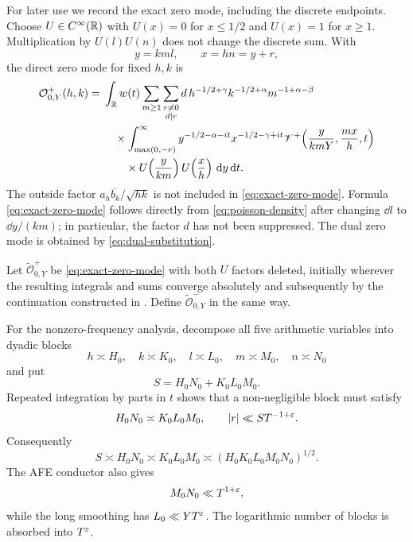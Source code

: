 For later use we record the exact zero mode, including the discrete endpoints.
Choose $U\in C^\infty(\mathbb R)$ with $U(x)=0$ for $x\leq1/2$ and $U(x)=1$ for
$x\geq1$.  Multiplication by $U(l)U(n)$ does not change the discrete sum.
With
\begin{equation}\label{eq:xy-def}
                         y=kml,\qquad x=hn=y+r,
\end{equation}
the direct zero mode for fixed $h,k$ is
\begin{align}
 \mathcal O^+_{0,Y}(h,k)
 ={}&\int_{\mathbb R}w(t)\sum_{m\geq1}
 \sum_{\substack{r\neq0\\d\mid r}}
 d\,h^{-1/2+\gamma}k^{-1/2+\alpha}m^{-1+\alpha-\beta}
 \notag\\
 &\quad\times\int_{\max(0,-r)}^\infty
 y^{-1/2-\alpha-it}x^{-1/2-\gamma+it}
 \mathscr V^+\!\left(\frac{y}{kmY},\frac{mx}{h},t\right)\notag\\
 &\qquad\times
 U\!\left(\frac{y}{km}\right)U\!\left(\frac{x}{h}\right)
 \,\mathrm d y\,\mathrm d t.
 \label{eq:exact-zero-mode}
\end{align}
The outside factor $a_h\overline{b_k}/\sqrt{hk}$ is not included in
\eqref{eq:exact-zero-mode}.  Formula \eqref{eq:exact-zero-mode} follows
directly from \eqref{eq:poisson-density} after changing $\dd l$ to
$\dd y/(km)$; in particular, the factor $d$ has not been suppressed.  The
dual zero mode is obtained by \eqref{eq:dual-substitution}.

Let $\widetilde{\mathcal O}_{0,Y}^+$ be
\eqref{eq:exact-zero-mode} with both $U$ factors deleted, initially wherever
the resulting integrals and sums converge absolutely and subsequently by the
continuation constructed in .  Define
$\widetilde{\mathcal O}_{0,Y}^-$ in the same way.

For the nonzero-frequency analysis, decompose all five arithmetic variables
into dyadic blocks
\[
 h\asymp H_0,\quad k\asymp K_0,\quad l\asymp L_0,\quad
 m\asymp M_0,\quad n\asymp N_0
\]
and put
\begin{equation}\label{eq:S-def}
                         S=H_0N_0+K_0L_0M_0.
\end{equation}
Repeated integration by parts in $t$ shows that a non-negligible block must
satisfy
\begin{equation}\label{eq:r-localization}
 H_0N_0\asymp K_0L_0M_0,\qquad
 |r|\ll ST^{-1+\varepsilon}.
\end{equation}
Consequently
\begin{equation}\label{eq:S-balance}
 S\asymp H_0N_0\asymp K_0L_0M_0
  \asymp(H_0K_0L_0M_0N_0)^{1/2}.
\end{equation}
The AFE conductor also gives
\begin{equation}\label{eq:MN-conductor}
                         M_0N_0\ll T^{1+\varepsilon},
\end{equation}
while the long smoothing has $L_0\ll YT^\varepsilon$.  The logarithmic number of
blocks is absorbed into $T^\varepsilon$.
